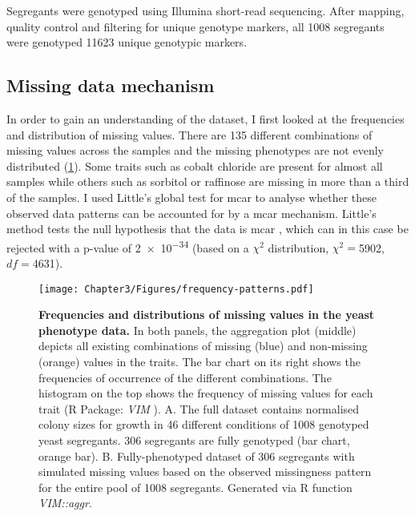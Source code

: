 Segregants were genotyped using Illumina short-read sequencing. After mapping, quality control and filtering for unique genotype markers,  all \num{1008} segregants were genotyped \num{11623} unique genotypic markers. 

\subsection{Missing data mechanism} 
In order to gain an understanding of the dataset, I first looked at the frequencies and distribution of missing values. There are \num{135} different combinations of missing values across the samples and the missing phenotypes are not evenly distributed (\cref{fig:missingness}). Some traits such as cobalt chloride are present for almost all samples while others such as sorbitol or raffinose are missing in more than a third of the samples. I used Little's global test for \gls{mcar} to analyse whether these observed data patterns can be accounted for by a \gls{mcar} mechanism. Little's method tests the null hypothesis that the data is \gls{mcar} \citep{Little1988,Beaujean2015}, which can in this case be rejected with a p-value of \num{2e-34} (based on a \(\chi^2\) distribution, \(\chi^2=\)\num{5902}, \(df=\)\num{4631}). 

\begin{figure}[p]
	\centering
	\texttt{[image: Chapter3/Figures/frequency-patterns.pdf]}
	\caption[\textbf{Frequencies and distributions of missing values in the yeast phenotype data.}]{\textbf{Frequencies and distributions of missing values in the yeast phenotype data. }In both panels, the aggregation plot (middle) depicts all existing combinations of missing (blue) and non-missing (orange) values in the traits. The bar chart on its right shows the frequencies of occurrence of the different combinations. The histogram on the top shows the frequency of missing values for each trait (R Package: \emph{VIM} \citep{Templ2012}). A. The full dataset contains normalised colony sizes for growth in \num{46} different conditions of \num{1008} genotyped yeast segregants. \num{306} segregants are fully genotyped (bar chart, orange bar). B. Fully-phenotyped dataset of \num{306} segregants with simulated missing values based on the observed missingness pattern for the entire pool of \num{1008} segregants.  Generated via R function \textit{VIM::aggr}.}
 	\label{fig:missingness}
\end{figure}


